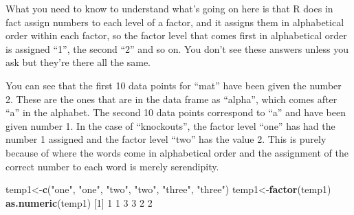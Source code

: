 \documentclass[
]{book}
\newenvironment{Shaded}{\begin{snugshade}}{\end{snugshade}}
\newcommand{\DecValTok}[1]{\textcolor[rgb]{0.00,0.00,0.81}{#1}}
\newcommand{\KeywordTok}[1]{\textcolor[rgb]{0.13,0.29,0.53}{\textbf{#1}}}
\newcommand{\NormalTok}[1]{#1}
\newcommand{\OperatorTok}[1]{\textcolor[rgb]{0.81,0.36,0.00}{\textbf{#1}}}
\newcommand{\StringTok}[1]{\textcolor[rgb]{0.31,0.60,0.02}{#1}}
\begin{document}
What you need to know to understand what's going on here is that R does in fact assign numbers to each level of a factor, and it assigns them in alphabetical order within each factor, so the factor level that comes first in alphabetical order is assigned ``1'', the second ``2'' and so on. You don't see these answers unless you ask but they're there all the same.

\begin{Shaded}
\end{Shaded}

You can see that the first 10 data points for ``mat'' have been given the number 2. These are the ones that are in the data frame as ``alpha'', which comes after ``a'' in the alphabet. The second 10 data points correspond to ``a'' and have been given number 1. In the case of ``knockouts'', the factor level ``one'' has had the number 1 assigned and the factor level ``two'' has the value 2. This is purely because of where the words come in alphabetical order and the assignment of the correct number to each word is merely serendipity.

\begin{Shaded}
\begin{Highlighting}[]
\NormalTok{temp1<-}\KeywordTok{c}\NormalTok{(}\StringTok{"one"}\NormalTok{, }\StringTok{"one"}\NormalTok{, }\StringTok{"two"}\NormalTok{, }\StringTok{"two"}\NormalTok{, }\StringTok{"three"}\NormalTok{, }\StringTok{"three"}\NormalTok{)}
\NormalTok{temp1<-}\KeywordTok{factor}\NormalTok{(temp1)}
\KeywordTok{as.numeric}\NormalTok{(temp1)}
\NormalTok{[}\DecValTok{1}\NormalTok{] }\DecValTok{1} \DecValTok{1} \DecValTok{3} \DecValTok{3} \DecValTok{2} \DecValTok{2}
\end{Highlighting}
\end{Shaded}
\end{document}

